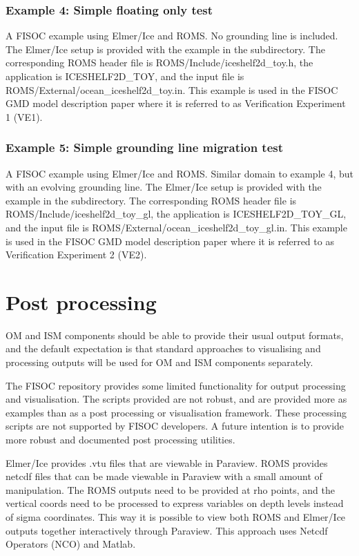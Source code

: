 \documentclass[11pt]{article}
\begin{document}
\subsubsection{Example 4: Simple floating only test}
A FISOC example using Elmer/Ice and ROMS. No grounding line is included. 
The Elmer/Ice setup is provided with the example in the subdirectory. 
The corresponding ROMS header file is ROMS/Include/iceshelf2d\_toy.h, 
the application is ICESHELF2D\_TOY, 
and the input file is ROMS/External/ocean\_iceshelf2d\_toy.in.
This example is used in the FISOC GMD model description paper where it is
referred to as Verification Experiment 1 (VE1).

\subsubsection{Example 5: Simple grounding line migration test}
A FISOC example using Elmer/Ice and ROMS. Similar domain to 
example 4, but with an evolving grounding line.
The Elmer/Ice setup is provided with the example in the subdirectory. 
The corresponding ROMS header file is ROMS/Include/iceshelf2d\_toy\_gl, 
the application is ICESHELF2D\_TOY\_GL, 
and the input file is ROMS/External/ocean\_iceshelf2d\_toy\_gl.in.
This example is used in the FISOC GMD model description paper where it is
referred to as Verification Experiment 2 (VE2).



\section{Post processing}

OM and ISM components should be able to provide their usual output formats,  
and the default expectation is that standard approaches to visualising and 
processing outputs will be used for OM and ISM components separately. 

The FISOC repository provides some limited functionality for output processing and
visualisation. 
The scripts provided are not robust, and are provided more as examples than as a
post processing or visualisation framework. 
These processing scripts are not supported by FISOC developers. 
A future intention  is to provide more robust and documented post processing
utilities. 

Elmer/Ice provides .vtu files that are viewable in Paraview.
ROMS provides netcdf files that can be made viewable in Paraview with a small amount
of manipulation.
The ROMS outputs need to be provided at rho points, and the vertical coords need to be processed to
express variables on depth levels instead of sigma coordinates. 
This way it is possible to view both ROMS and Elmer/Ice outputs together interactively through Paraview. 
This approach uses Netcdf Operators (NCO) and Matlab. 
\end{document}
